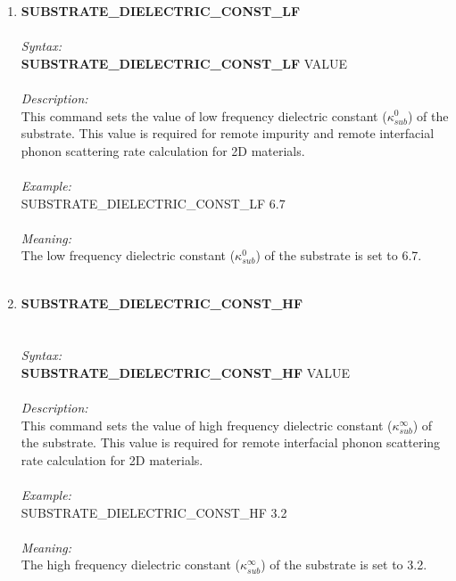 \documentclass[12pt]{article}
\begin{document}
\begin{enumerate}
    \item \textbf{SUBSTRATE\_DIELECTRIC\_CONST\_LF} \\  \\
    \textit{Syntax:} \\
    \textbf{SUBSTRATE\_DIELECTRIC\_CONST\_LF} VALUE \\ \\
    \textit{Description:} \\
    This command sets the value of low frequency dielectric constant ($\kappa_{sub}^0$) of the substrate. This value is required for remote impurity and remote interfacial phonon scattering rate calculation for 2D materials. \\ \\
    \textit{Example:} \\
    SUBSTRATE\_DIELECTRIC\_CONST\_LF 6.7 \\ \\
    \textit{Meaning:} \\    
    The low frequency dielectric constant ($\kappa_{sub}^0$) of the substrate is set to 6.7. \\ \\ 
    
    \item \textbf{SUBSTRATE\_DIELECTRIC\_CONST\_HF}  \\ \\ \\
    \textit{Syntax:} \\
    \textbf{SUBSTRATE\_DIELECTRIC\_CONST\_HF} VALUE \\ \\
    \textit{Description:} \\
    This command sets the value of high frequency dielectric constant ($\kappa_{sub}^{\infty}$) of the substrate. This value is required for remote interfacial phonon scattering rate calculation for 2D materials. \\ \\
    \textit{Example:} \\
    SUBSTRATE\_DIELECTRIC\_CONST\_HF 3.2 \\ \\
    \textit{Meaning:} \\    
    The high frequency dielectric constant ($\kappa_{sub}^{\infty}$) of the substrate is set to 3.2. \\ \\
    

\end{enumerate}
\end{document}
